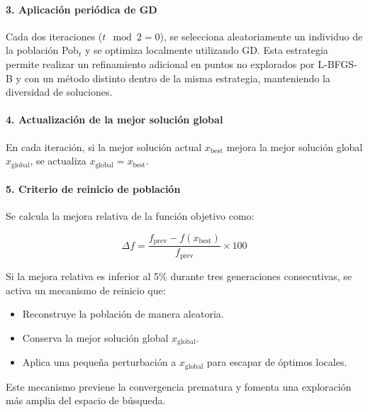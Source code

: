 \paragraph{3. Aplicación periódica de GD\\}

Cada dos iteraciones ($t \mod 2 = 0$), se selecciona aleatoriamente un individuo de la población Pob$_t$ y se optimiza localmente utilizando GD. Esta estrategia permite realizar un refinamiento adicional en puntos no explorados por L-BFGS-B y con un método distinto dentro de la misma estrategia, manteniendo la diversidad de soluciones.

\paragraph{4. Actualización de la mejor solución global\\}

En cada iteración, si la mejor solución actual $x_{\text{best}}$ mejora la mejor solución global $x_{\text{global}}$, se actualiza $x_{\text{global}} = x_{\text{best}}$.

\paragraph{5. Criterio de reinicio de población\\}

Se calcula la mejora relativa de la función objetivo como:

\begin{equation*}
    \Delta f = \frac{f_{\text{prev}} - f(x_{\text{best}})}{f_{\text{prev}}} \times 100
\end{equation*}

Si la mejora relativa es inferior al 5\% durante tres generaciones consecutivas, se activa un mecanismo de reinicio que:

\begin{itemize}
    \item Reconstruye la población de manera aleatoria.
    \item Conserva la mejor solución global $x_{\text{global}}$.
    \item Aplica una pequeña perturbación a $x_{\text{global}}$ para escapar de óptimos locales.
\end{itemize}

Este mecanismo previene la convergencia prematura y fomenta una exploración más amplia del espacio de búsqueda.

